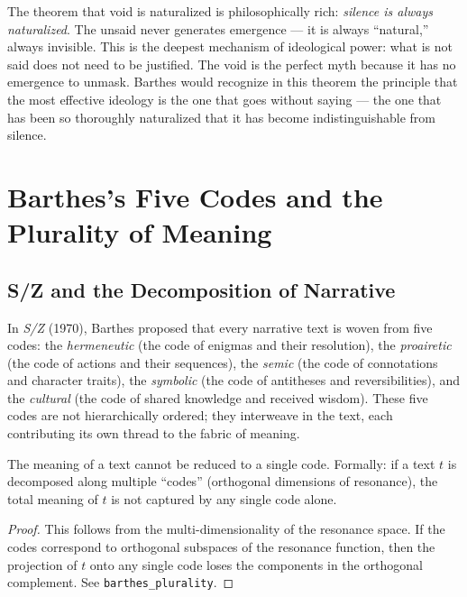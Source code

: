 \begin{interpretation}
The theorem that void is naturalized is philosophically rich:
\emph{silence is always naturalized}. The unsaid never generates
emergence --- it is always ``natural,'' always invisible. This is the
deepest mechanism of ideological power: what is not said does not need
to be justified. The void is the perfect myth because it has no
emergence to unmask. Barthes would recognize in this theorem the
principle that the most effective ideology is the one that goes
without saying --- the one that has been so thoroughly naturalized that
it has become indistinguishable from silence.
\end{interpretation}

\section{Barthes's Five Codes and the Plurality of Meaning}

\subsection{S/Z and the Decomposition of Narrative}

In \textit{S/Z} (1970), Barthes proposed that every narrative text is
woven from five codes: the \emph{hermeneutic} (the code of enigmas and
their resolution), the \emph{proairetic} (the code of actions and their
sequences), the \emph{semic} (the code of connotations and character
traits), the \emph{symbolic} (the code of antitheses and
reversibilities), and the \emph{cultural} (the code of shared
knowledge and received wisdom). These five codes are not hierarchically
ordered; they interweave in the text, each contributing its own thread
to the fabric of meaning.

\begin{theorem}
\label{thm:barthes-plurality}
The meaning of a text cannot be reduced to a single code. Formally:
if a text $t$ is decomposed along multiple ``codes'' (orthogonal
dimensions of resonance), the total meaning of $t$ is not captured
by any single code alone.
\end{theorem}

\begin{proof}
This follows from the multi-dimensionality of the resonance space.
If the codes correspond to orthogonal subspaces of the resonance
function, then the projection of $t$ onto any single code loses
the components in the orthogonal complement. See
\texttt{barthes\_plurality}.
\end{proof}

